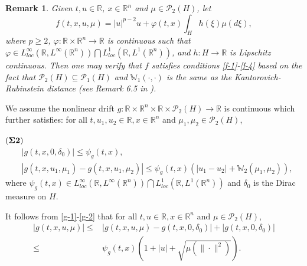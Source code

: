 \documentclass[11pt]{article}
\numberwithin{equation}{section}
\theoremstyle{plain}
\newtheorem{remark}{Remark}[section]
\def\leq{\leqslant}
\begin{document}
\begin{remark}
  Given  $t,u \in \mathbb{R}$,
          $x \in \mathbb{R}^n$
          and $\mu \in \mathcal{P}_2(H)$,
  let
     $$ f(t,x,u,\mu) = |u|^{p-2} u + \varphi(t,x) \int_{H}  h(\xi)\mu(d\xi), $$
  where
  $p\ge 2$,
  $\varphi:  \mathbb{R} \times \mathbb{R}^n \to \mathbb{R} $
  is continuous such that
  $\varphi
  \in
  L_{loc}^\infty( \mathbb{R},
  L^\infty(\mathbb{R}^n) )
  \bigcap
  L_{loc}^1( \mathbb{R}, L^1(\mathbb{R}^n) )$,
  and $h: H \rightarrow \mathbb{R}$ is     Lipschitz continuous.
  Then one may verify    that $f $ satisfies
  conditions \eqref{f-1}-\eqref{f-4}
  based on the fact that
  $\mathcal{P}_2(H) \subseteq \mathcal{P}_1(H)$
  and $\mathbb{W}_1(\cdot, \cdot)$ is the same as the Kantorovich-Rubinstein distance (see Remark 6.5  in \cite{villani2009}).
\end{remark}


We assume   the nonlinear
drift
$ g: \mathbb{R} \times \mathbb{R}^n \times \mathbb{R} \times \mathcal {P}_2(H)
\rightarrow \mathbb{R}$
is continuous which
further satisfies:
 for all $t, u_1, u_2 \in \mathbb{R},
  x \in \mathbb{R}^n$
and $\mu_1, \mu_2 \in \mathcal{P}_2(H)$,

  \noindent
 $({\bf \Sigma 2})$\
 \begin{align}
   & |g(t,x,0, \delta_0)| \leq \psi_g(t,x),   \label{g-1}  \\
   & |g(t,x, u_1, \mu_1) - g(t,x, u_1, \mu_2)|
     \leq \psi_g(t,x)
          \left( | u_1 - u_2 | + \mathbb{W}_2(\mu_1, \mu_2)
          \right),   \label{g-2}
\end{align}
 where
   $\psi_g(t,x) \in L_{loc}^\infty (\mathbb{R}, L^\infty (\mathbb{R}^n) )
                    \bigcap
                    L_{loc}^1 (\mathbb{R}, L^1 (\mathbb{R}^n) )$
   and $\delta_0$ is
   the  Dirac measure on $H$.

   It follows from \eqref{g-1}-\eqref{g-2} that
   for all
    $t, u  \in \mathbb{R},
   x \in \mathbb{R}^n$
   and $\mu  \in \mathcal{P}_2(H)$,
\begin{align} \label{g-3}
     |g(t,x, u, \mu)|
     \leq & |g(t,x, u, \mu) - g(t,x,0, \delta_0)|
             + |g(t,x,0, \delta_0)|
                \nonumber \\
     \leq & \psi_g(t,x)
                      \left (
                             1 + |u| + \sqrt{ \mu( \|\cdot\|^2) }
                      \right ).
\end{align}
\end{document}
